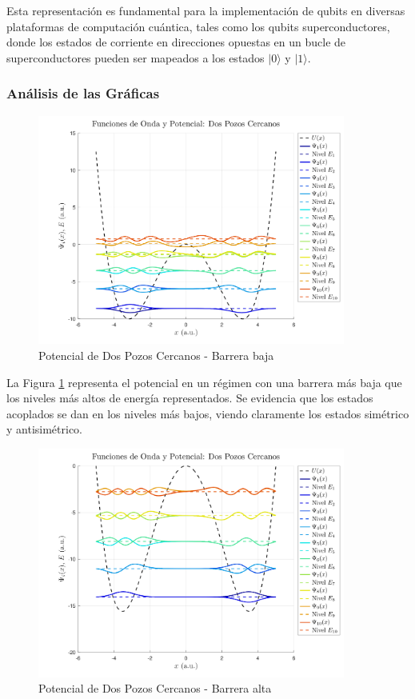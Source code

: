 \documentclass[a4paper,12pt]{article}
\begin{document}
Esta representación es fundamental para la implementación de qubits en diversas plataformas de computación cuántica, tales como los qubits superconductores, donde los estados de corriente en direcciones opuestas en un bucle de superconductores pueden ser mapeados a los estados \(|0\rangle\) y \(|1\rangle\).

\subsubsection{Análisis de las Gráficas}

\begin{figure}[H]
    \centering
    \includegraphics[width=0.9\textwidth]{img/Dos_Pozos_Cercanos_medium.png}
    \caption{Potencial de Dos Pozos Cercanos - Barrera baja}
    \label{fig:dos_pozos_cercanos_medium}
\end{figure}

\noindent
La Figura \ref{fig:dos_pozos_cercanos_medium} representa el potencial en un régimen con una barrera más baja que los niveles más altos de energía representados. Se evidencia que los estados acoplados se dan en los niveles más bajos, viendo claramente los estados simétrico y antisimétrico.

\begin{figure}[H]
    \centering
    \includegraphics[width=0.9\textwidth]{img/Dos_Pozos_Cercanos_high.png}
    \caption{Potencial de Dos Pozos Cercanos - Barrera alta}
    \label{fig:dos_pozos_cercanos_high}
\end{figure}
\end{document}
